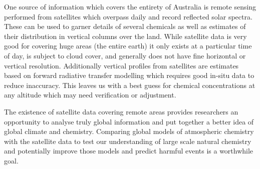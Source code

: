 One source of information which covers the entirety of Australia is remote sensing performed from satellites which overpass daily and record reflected solar spectra.
These can be used to garner details of several chemicals as well as estimates of their distribution in vertical columns over the land.
While satellite data is very good for covering huge areas (the entire earth) it only exists at a particular time of day, is subject to cloud cover, and generally does not have fine horizontal or vertical resolution.
Additionally vertical profiles from satellites are estimates based on forward radiative transfer modelling which requires good in-situ data to reduce inaccuracy.
This leaves us with a best guess for chemical concentrations at any altitude which may need verification or adjustment.

The existence of satellite data covering remote areas provides researchers an opportunity to analyse truly global information and put together a better idea of global climate and chemistry.
Comparing global models of atmospheric chemistry with the satellite data to test our understanding of large scale natural chemistry and potentially improve those models and predict harmful events is a worthwhile goal.